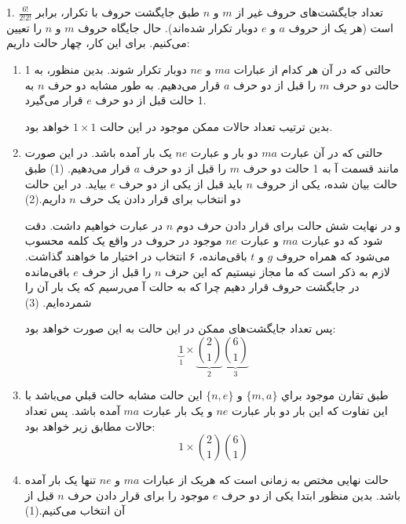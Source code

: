   
    1. 
    \p
    تعداد جایگشت‌های حروف غیر از $m$ و $n$ طبق جایگشت حروف با تکرار، برابر $\frac{6!}{2!2!}$ است
    (هر یک از حروف $a$ و $e$ دوبار تکرار شده‌اند).
    حال جایگاه حروف $m$ و $n$ را تعیین می‌کنیم.
    برای این کار، چهار حالت داریم:
    \begin{enumerate}
      \item 
      \p
      حالتی که در آن هر کدام از عبارات $ma$ و $ne$
      دوبار تکرار شوند. بدین منظور، به 1 حالت دو حرف 
      $m$ 
      را قبل از دو حرف 
      $a$
      قرار می‌دهیم.
      به طور مشابه دو حرف
       $n$ 
     به 1 حالت قبل از دو حرف 
       $e$
       قرار می‌گیرد.
      
      \p
      بدین ترتیب تعداد حالات ممکن موجود در این حالت 
      $1\times1$
      خواهد بود.
      
      \item
      \p
      حالتی که در آن عبارت $ma$ دو بار و عبارت $ne$ 
      یک بار آمده باشد. در این صورت مانند قسمت آ به 1 حالت  
       دو حرف 
      $m$
      را قبل از دو حرف 
      $a$
      قرار می‌دهیم.
      (1)
      \p
      طبق حالت بیان شده، یکی از حروف $n$ باید قبل از یکی از دو حرف $e$
      بیاید. در این حالت دو انتخاب برای قرار دادن یک حرف $n$ داریم.(2)
      
      \p
      و در نهایت شش حالت برای قرار دادن حرف دوم $n$ در عبارت خواهیم داشت.
      دقت شود که دو عبارت $ma$ و عبارت $ne$ موجود در حروف
      در واقع یک کلمه محسوب می‌شود که همراه حروف  $g$ و $t$ باقی‌مانده، ۶ انتخاب در اختیار ما خواهند گذاشت.
      لازم به ذکر است که ما مجاز نیستیم که این حرف $n$ را قبل از حرف $e$ باقی‌مانده در جایگشت حروف قرار دهیم چرا که به حالت آ می‌رسیم که یک بار آن را شمرده‌ایم.
      (3)
      
      \p
      پس تعداد جایگشت‌های ممکن در این حالت به این صورت خواهد بود:
      $$\underbrace{1}_{1}\times\underbrace{{2 \choose 1}}_{2}\underbrace{{6\choose 1}}_{3}$$
      
      \item
      \p
      طبق تقارن موجود براي 
      $\{m,a\}$ و
      $\{n,e\}$
      اين حالت  مشابه حالت قبلي می‌باشد با این تفاوت که این بار دو بار 
      عبارت $ne$ و یک بار عبارت $ma$ آمده باشد.
      پس تعداد حالات مطابق زیر خواهد بود:
      $$1\times{2 \choose 1}{6\choose 1}$$
      
      \item
      \p
      حالت نهایی مختص به زمانی است که هریک از عبارات $ma$ و $ne$ تنها یک بار آمده باشد.
      بدین منظور ابتدا یکی از دو حرف $e$ موجود را برای قرار دادن حرف $n$ قبل از آن انتخاب می‌کنیم.(1)
      

\end{enumerate}
